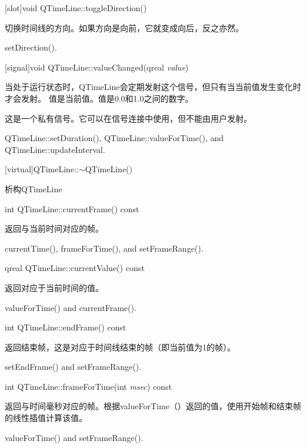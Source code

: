[slot]void QTimeLine::toggleDirection()

切换时间线的方向。如果方向是向前，它就变成向后，反之亦然。

\begin{seeAlso}
setDirection().
\end{seeAlso}

[signal]void QTimeLine::valueChanged(qreal \emph{value})

当处于运行状态时，QTimeLine会定期发射这个信号，但只有当当前值发生变化时才会发射。 值是当前值。值是0.0和1.0之间的数字。

\begin{notice}
这是一个私有信号。它可以在信号连接中使用，但不能由用户发射。
\end{notice}

\begin{seeAlso}
QTimeLine::setDuration(), QTimeLine::valueForTime(), and QTimeLine::updateInterval.
\end{seeAlso}

[virtual]QTimeLine::$\sim$QTimeLine()

析构QTimeLine

int QTimeLine::currentFrame() const

返回与当前时间对应的帧。

\begin{seeAlso}
currentTime(), frameForTime(), and setFrameRange().
\end{seeAlso}

qreal QTimeLine::currentValue() const

返回对应于当前时间的值。

\begin{seeAlso}
valueForTime() and currentFrame().
\end{seeAlso}

int QTimeLine::endFrame() const

返回结束帧，这是对应于时间线结束的帧（即当前值为1的帧）。

\begin{seeAlso}
setEndFrame() and setFrameRange().
\end{seeAlso}

int QTimeLine::frameForTime(int \emph{msec}) const

返回与时间毫秒对应的帧。根据valueForTime（）返回的值，使用开始帧和结束帧的线性插值计算该值。

\begin{seeAlso}
valueForTime() and setFrameRange().
\end{seeAlso}

